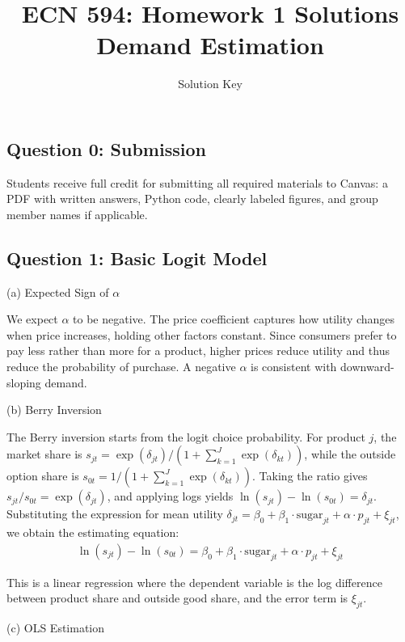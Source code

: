 \documentclass[11pt]{article}
\title{ECN 594: Homework 1 Solutions \\ \large{Demand Estimation}}
\author{Solution Key}
\date{}
\begin{document}
\maketitle

\subsection*{Question 0: Submission}

Students receive full credit for submitting all required materials to Canvas: a PDF with written answers, Python code, clearly labeled figures, and group member names if applicable.

\subsection*{Question 1: Basic Logit Model}

(a) Expected Sign of $\alpha$

We expect $\alpha$ to be negative. The price coefficient captures how utility changes when price increases, holding other factors constant. Since consumers prefer to pay less rather than more for a product, higher prices reduce utility and thus reduce the probability of purchase. A negative $\alpha$ is consistent with downward-sloping demand.

\vspace{1em}
(b) Berry Inversion

The Berry inversion starts from the logit choice probability. For product $j$, the market share is $s_{jt} = \exp(\delta_{jt}) / (1 + \sum_{k=1}^{J} \exp(\delta_{kt}))$, while the outside option share is $s_{0t} = 1 / (1 + \sum_{k=1}^{J} \exp(\delta_{kt}))$. Taking the ratio gives $s_{jt} / s_{0t} = \exp(\delta_{jt})$, and applying logs yields $\ln(s_{jt}) - \ln(s_{0t}) = \delta_{jt}$. Substituting the expression for mean utility $\delta_{jt} = \beta_0 + \beta_1 \cdot \text{sugar}_{jt} + \alpha \cdot p_{jt} + \xi_{jt}$, we obtain the estimating equation:
\begin{align*}
\boxed{\ln(s_{jt}) - \ln(s_{0t}) = \beta_0 + \beta_1 \cdot \text{sugar}_{jt} + \alpha \cdot p_{jt} + \xi_{jt}}
\end{align*}

This is a linear regression where the dependent variable is the log difference between product share and outside good share, and the error term is $\xi_{jt}$.

\vspace{1em}
(c) OLS Estimation
\end{document}
